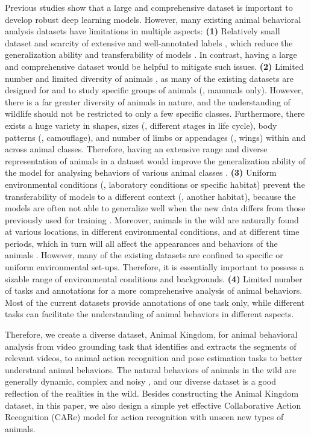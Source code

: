 \documentclass[10pt,twocolumn,letterpaper]{article}
\begin{document}
    Previous studies \cite{von2021big, cao2019cross} show that a large and comprehensive dataset is important to develop robust deep learning models. However, many existing animal behavioral analysis datasets have limitations in multiple aspects: 
    \textbf{(1)} Relatively small dataset and scarcity of extensive and well-annotated labels \cite{von2021big}, which reduce the generalization ability and transferability of models \cite{von2021big}. In contrast, having a large and comprehensive dataset would be helpful to mitigate such issues. 
    \textbf{(2)} Limited number and limited diversity of animals \cite{ANDERSON201418, von2021big}, as many of the existing datasets are designed for and to study specific groups of animals (\eg, mammals only). However, there is a far greater diversity of animals in nature, and the understanding of wildlife should not be restricted to only a few specific classes. Furthermore, there exists a huge variety in shapes, sizes (\eg, different stages in life cycle), body patterns (\eg, camouflage), and number of limbs or appendages (\eg, wings) within and across animal classes. Therefore, having an extensive range and diverse representation of animals in a dataset would improve the generalization ability of the model for analysing behaviors of various animal classes \cite{von2021big}. 
    \textbf{(3)} Uniform environmental conditions (\eg, laboratory conditions or specific habitat) prevent the transferability of models to a different context (\eg, another habitat), because the models are often not able to generalize well when the new data differs from those previously used for training \cite{von2021big}. Moreover, animals in the wild are naturally found at various locations, in different environmental conditions, and at different time periods, which in turn will all affect the appearances and behaviors of the animals \cite{graving2019deepposekit}.  
    However, many of the existing datasets are confined to specific or uniform environmental set-ups. Therefore, it is essentially important to possess a sizable range of environmental conditions and backgrounds. 
    \textbf{(4)} Limited number of tasks and annotations for a more comprehensive analysis of animal behaviors. Most of the current datasets provide annotations of one task only, while different tasks can facilitate the understanding of animal behaviors in different aspects.
    
    Therefore, we create a diverse dataset, Animal Kingdom, for animal behavioral analysis from video grounding task that identifies and extracts the segments of relevant videos, to animal action recognition and pose estimation tasks to better understand animal behaviors. The natural behaviors of animals in the wild are generally dynamic, complex and noisy \cite{MATHIS20201, pereira2019fast, van2020deep}, and our diverse dataset is a good reflection of the realities in the wild. Besides constructing the Animal Kingdom dataset, in this paper, we also design a simple yet effective Collaborative Action Recognition (CARe) model for action recognition with unseen new types of animals. 
    
\end{document}
